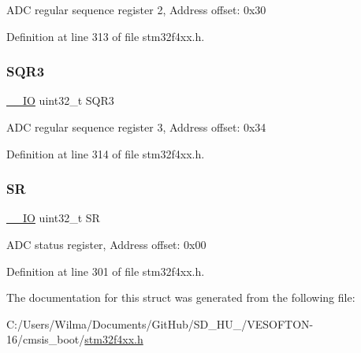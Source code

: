 A\+DC regular sequence register 2, Address offset\+: 0x30 

Definition at line 313 of file stm32f4xx.\+h.

\mbox{\label{struct_a_d_c___type_def_a97e40d9928fa25a5628d6442f0aa6c0f}} 
\subsubsection{\texorpdfstring{S\+Q\+R3}{SQR3}}
{\footnotesize\ttfamily \hyperlink{group___c_m_s_i_s__core__definitions_gaec43007d9998a0a0e01faede4133d6be}{\+\_\+\+\_\+\+IO} uint32\+\_\+t S\+Q\+R3}

A\+DC regular sequence register 3, Address offset\+: 0x34 

Definition at line 314 of file stm32f4xx.\+h.

\mbox{\label{struct_a_d_c___type_def_af6aca2bbd40c0fb6df7c3aebe224a360}} 
\subsubsection{\texorpdfstring{SR}{SR}}
{\footnotesize\ttfamily \hyperlink{group___c_m_s_i_s__core__definitions_gaec43007d9998a0a0e01faede4133d6be}{\+\_\+\+\_\+\+IO} uint32\+\_\+t SR}

A\+DC status register, Address offset\+: 0x00 

Definition at line 301 of file stm32f4xx.\+h.



The documentation for this struct was generated from the following file\+:\begin{DoxyCompactItemize}
\item 
C\+:/\+Users/\+Wilma/\+Documents/\+Git\+Hub/\+S\+D\+\_\+\+H\+U\+\_/\+V\+E\+S\+O\+F\+T\+O\+N-\/16/cmsis\+\_\+boot/\hyperlink{stm32f4xx_8h}{stm32f4xx.\+h}\end{DoxyCompactItemize}
